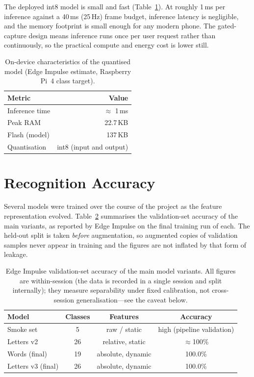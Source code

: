 The deployed int8 model is small and fast (Table~\ref{tab:perf}). At roughly
1\,ms per inference against a 40\,ms (25\,Hz) frame budget, inference latency is
negligible, and the memory footprint is small enough for any modern phone. The
gated-capture design means inference runs once per user request rather than
continuously, so the practical compute and energy cost is lower still.

\begin{table}[!htbp]
\centering
\caption{\label{tab:perf}On-device characteristics of the quantised model
(Edge Impulse estimate, Raspberry Pi~4 class target).}
\begin{tabular}{lr}
\toprule
Metric & Value \\
\midrule
Inference time   & $\approx$ 1\,ms \\
Peak RAM         & 22.7\,KB \\
Flash (model)    & 137\,KB \\
Quantisation     & int8 (input and output) \\
\bottomrule
\end{tabular}
\end{table}

\section{Recognition Accuracy}

Several models were trained over the course of the project as the feature
representation evolved. Table~\ref{tab:acc} summarises the validation-set
accuracy of the main variants, as reported by Edge Impulse on the final
training run of each. The held-out split is taken \emph{before} augmentation,
so augmented copies of validation samples never appear in training and the
figures are not inflated by that form of leakage.

\begin{table}[!htbp]
\centering
\caption{\label{tab:acc}Edge Impulse validation-set accuracy of the main model
variants. All figures are within-session (the data is recorded in a single
session and split internally); they measure separability under fixed
calibration, not cross-session generalisation---see the caveat below.}
\begin{tabular}{lccc}
\toprule
Model & Classes & Features & Accuracy \\
\midrule
Smoke set        & 5  & raw / static     & high (pipeline validation) \\
Letters v2       & 26 & relative, static & $\approx$100\% \\
Words (final)    & 19 & absolute, dynamic& 100.0\% \\
Letters v3 (final)& 26 & absolute, dynamic& 100.0\% \\
\bottomrule
\end{tabular}
\end{table}

